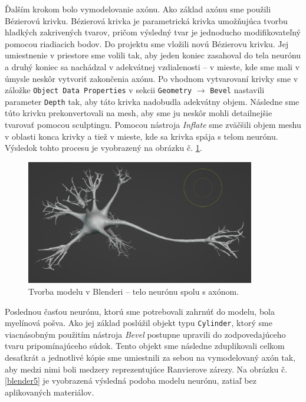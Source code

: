 Ďalším krokom bolo vymodelovanie axónu. Ako základ axónu sme použili Bézierovú krivku. Bézierová krivka je parametrická krivka umožňujúca tvorbu hladkých zakrivených tvarov, pričom výsledný tvar je
jednoducho modifikovateľný pomocou riadiacich bodov. Do projektu sme vložili novú Bézierovu krivku. Jej umiestnenie v priestore sme volili tak, aby jeden koniec zasahoval do tela neurónu 
a druhý koniec sa nachádzal v adekvátnej vzdialenosti {--} v mieste, kde sme mali v úmysle neskôr vytvoriť zakončenia axónu. Po vhodnom vytvarovaní krivky sme v záložke \texttt{Object Data Properties}
v sekcii \texttt{Geometry} $\rightarrow$ \texttt{Bevel} nastavili parameter \texttt{Depth} tak, aby táto krivka nadobudla adekvátny objem. Následne sme túto krivku prekonvertovali na mesh, aby 
sme ju neskôr mohli detailnejšie tvarovať pomocou sculptingu. 
Pomocou nástroja \emph{Inflate} sme zväčšili objem meshu v oblasti konca krivky a tiež v mieste, kde sa krivka spája s telom neurónu. Výsledok tohto procesu je vyobrazený na obrázku č. \ref{blender4}.

\begin{figure}[!htbp]
  \centering
  \includegraphics[width=10cm]{img/n5-crop.png}
  \caption{Tvorba modelu v Blenderi {--} telo neurónu spolu s axónom.}
  \label{blender4}
\end{figure}	

Poslednou časťou neurónu, ktorú sme potrebovali zahrnúť do modelu, bola myelínová pošva. Ako jej základ poslúžil objekt typu \texttt{Cylinder}, ktorý sme viacnásobným použitím nástroja \emph{Bevel} postupne
upravili do zodpovedajúceho tvaru pripomínajúceho súdok. Tento objekt sme následne zduplikovali celkom desaťkrát a jednotlivé kópie sme umiestnili za sebou na vymodelovaný axón tak, aby medzi 
nimi boli medzery reprezentujúce Ranvierove zárezy. Na obrázku č. \ref{blender5} je vyobrazená výsledná podoba modelu neurónu, zatiaľ bez aplikovaných materiálov.
 
